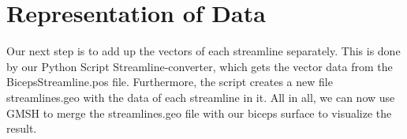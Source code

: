 \documentclass[preprint,journal]{vgtc}       %
\begin{document}
\section{Representation of Data}
Our next step is to add up the vectors of each streamline separately. This is done by our Python Script Streamline-converter, which gets the vector data from the BicepsStreamline.pos file. Furthermore, the script creates a new file streamlines.geo with the data of each streamline in it. All in all, we can now use GMSH to merge the streamlines.geo file with our biceps surface to visualize the result.



\end{document}
